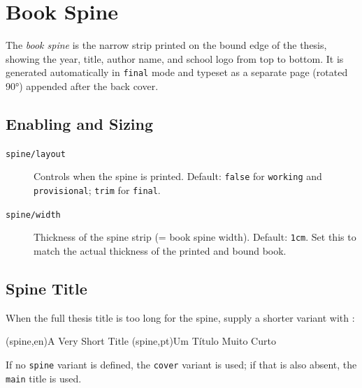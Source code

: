 \section{Book Spine}
\label{sec:spine}

The \emph{book spine} is the narrow strip printed on the bound edge of
the thesis, showing the year, title, author name, and school logo from
top to bottom.  It is generated automatically in \texttt{final} mode and
typeset as a separate page (rotated 90°) appended after the back cover.

\subsection{Enabling and Sizing}
\label{sub:spine_basic}

\begin{description}
  \item[\texttt{spine/layout}] Controls when the spine is printed.
    Default: \texttt{false} for \texttt{working} and \texttt{provisional};
    \texttt{trim} for \texttt{final}.
\begin{latexcode}
\end{latexcode}

  \item[\texttt{spine/width}] Thickness of the spine strip (= book spine
    width).  Default: \texttt{1cm}.  Set this to match the actual
    thickness of the printed and bound book.
\begin{latexcode}
\end{latexcode}
\end{description}

\subsection{Spine Title}
\label{sub:spine_title}

When the full thesis title is too long for the spine, supply a shorter
variant with \latexinline{\nttitle}:
\begin{latexcode}
\nttitle(spine,en){A Very Short Title}
\nttitle(spine,pt){Um Título Muito Curto}
\end{latexcode}
If no \texttt{spine} variant is defined, the \texttt{cover} variant is
used; if that is also absent, the \texttt{main} title is used.

